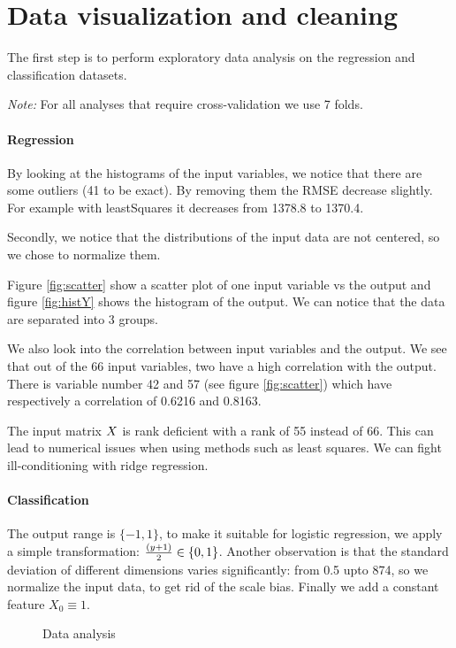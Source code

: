 \documentclass{article} %
\begin{document}
\section{Data visualization and cleaning}

The first step is to perform exploratory data analysis on the regression and classification datasets.

\emph{Note:} For all analyses that require cross-validation we use 7 folds. 

\paragraph{Regression} 
By looking at the histograms of the input variables, we notice that there are some outliers (41 to be exact). 
By removing them the RMSE decrease slightly.
For example with leastSquares it decreases from 1378.8 to 1370.4.

Secondly, we notice that the distributions of the input data are not centered, so we chose to normalize them.

Figure \ref{fig:scatter} show a scatter plot of one input variable vs the output and figure \ref{fig:histY} shows the histogram of the output.
We can notice that the data are separated into 3 groups.

We also look into the correlation between input variables and the output. We see that out of the 66 input variables, two have a high correlation with the output. There is variable number 42 and 57 (see figure \ref{fig:scatter}) which have respectively a correlation of 0.6216 and 0.8163.

The input matrix $\boldmath{X}$ is rank deficient with a rank of 55 instead of 66. This can lead to numerical issues when using methods such as least squares.
We can fight ill-conditioning with ridge regression. 

\paragraph{Classification}
The output range is $\{-1, 1\}$, to make it suitable for logistic regression, we apply a simple transformation: ${(y + 1)\over 2} \in \{0, 1\}$. Another observation is that the standard deviation of different dimensions varies significantly: from 0.5 upto 874, so we normalize the input data, to get rid of the scale bias. Finally we add a constant feature $X_0 \equiv 1$.

\begin{figure}[!t]
	\centering
	\caption{Data analysis}
\end{figure}
\end{document}
